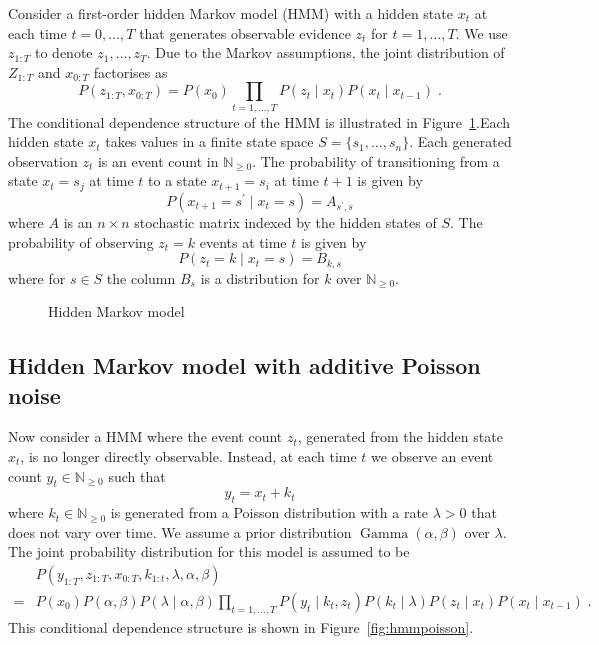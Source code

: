 \documentclass[twoside, 11pt]{article}
\DeclareMathOperator*{\gammad}{Gamma}
\newcommand{\nonnegint}[0] {\mathbb{N}_{\geq 0}}
\begin{document}
Consider a first-order hidden Markov model (HMM) with a hidden state $x_t$ at each time $t=0,\ldots,T$ that generates observable evidence $z_t$ for $t=1,\ldots,T$. We use $z_{1:T}$ to denote $z_1, \ldots, z_T$. Due to the Markov assumptions, the joint distribution of $Z_{1:T}$ and $x_{0:T}$ factorises as
\begin{equation}
P(z_{1:T}, x_{0:T}) = P(x_0) \prod_{t=1, \ldots, T} P(z_t \mid x_t) P(x_t \mid x_{t-1} ) \; .
\end{equation}
The conditional dependence structure of the HMM is illustrated in Figure~\ref{fig:hmm}.Each hidden state $x_t$ takes values in a finite state space $S = \{ s_1, \ldots, s_n \}$. Each generated observation $z_t$ is an event count in $\nonnegint$. The probability of transitioning from a state $x_t=s_j$ at time $t$ to a state $x_{t+1}=s_i$ at time $t+1$ is given by
\begin{equation}
P(x_{t+1}=s^{\prime} \mid x_t=s) = A_{s^{\prime},s}
\end{equation}
where $A$ is an $n \times n$ stochastic matrix indexed by the hidden states of $S$. The probability of observing $z_t=k$ events at time $t$ is given by
\begin{equation}
P(z_t=k \mid x_t=s) = B_{k, s}
\end{equation}
where for $s \in S$ the column $B_s$ is a distribution for $k$ over $\nonnegint$.


\begin{figure}[H]
\caption{Hidden Markov model}
\label{fig:hmm}
\end{figure}

\subsection{Hidden Markov model with additive Poisson noise}

Now consider a HMM where the event count $z_t$, generated from the hidden state $x_t$, is no longer directly observable. Instead, at each time $t$ we observe an event count $y_t \in \nonnegint$ such that
\begin{equation}
y_t = x_t + k_t
\end{equation}
where $k_t \in \nonnegint$ is generated from a Poisson distribution with a rate $\lambda > 0$ that does not vary over time. We assume a prior distribution $\gammad(\alpha, \beta)$ over $\lambda$. The joint probability distribution for this model is assumed to be
\begin{align}
& P(y_{1:T}, z_{1:T}, x_{0:T}, k_{1:t}, \lambda, \alpha, \beta) \nonumber \\
= & P(x_0) P(\alpha, \beta) P(\lambda \mid \alpha, \beta) \prod_{t=1, \ldots, T} P(y_t \mid k_t, z_t) P(k_t \mid \lambda) P(z_t \mid x_t) P(x_t \mid x_{t-1} ) \; .
\end{align}
This conditional dependence structure is shown in Figure~\ref{fig:hmmpoisson}.
\end{document}
